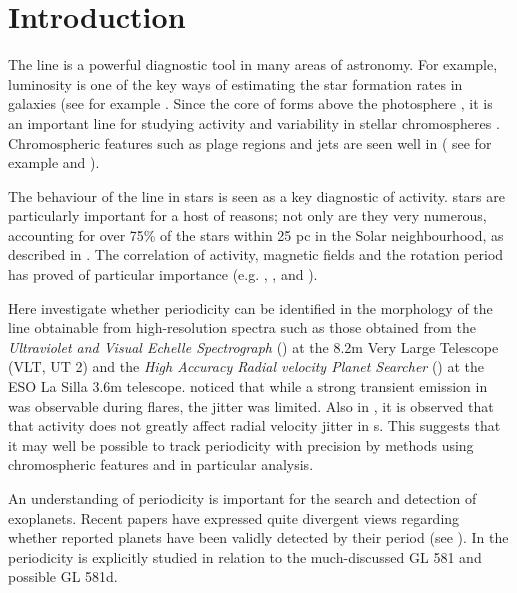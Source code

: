 \chapter{Introduction}
\protect\label{chapter:introduction}

The {\ha} line is a powerful diagnostic tool in many areas of astronomy. For example, {\ha} luminosity is one of the key
ways of estimating the star formation rates in galaxies (see for example \citet{rosagonzalez02}.  Since the core of
{\ha} forms above the photosphere \citep{vernazza81}, it is an important line for studying activity and variability in
stellar chromospheres \citep{hall08}. Chromospheric features such as plage regions and jets are seen well in {\ha} ( see
for example \citet{kneer10} and \citet{kuridze11}).

The behaviour of the {\ha} line in {\rdwarf} stars is seen as a key diagnostic of activity. {\rdwarf} stars are
particularly important for a host of reasons; not only are they very numerous, accounting for over 75\% of the stars
within 25 pc in the Solar neighbourhood, as described in \citet{winters15}. The correlation of activity, magnetic fields
and the rotation period has proved of particular importance (e.g. \citet{mohanty02}, \citet{mohanty03},
\citet{reiners08} and \citet{schmidt14}).

Here {\Firstp} investigate whether periodicity can be identified in the morphology of the {\ha} line obtainable from
high-resolution spectra such as those obtained from the \textit{Ultraviolet and Visual Echelle Spectrograph} ({\uves})
at the 8.2m Very Large Telescope (VLT, UT 2) and the \textit{High Accuracy Radial velocity Planet Searcher} ({\harps})
at the ESO La Silla 3.6m telescope.  \citet{barnes14} noticed that while a strong transient emission in {\ha} was
observable during flares, the jitter was limited. Also in \citet{reiners09}, it is observed that that activity does not
greatly affect radial velocity jitter in \rdwarf s. This suggests that it may well be possible to track periodicity with
precision by methods using chromospheric features and in particular {\ha} analysis.

An understanding of periodicity is important for the search and detection of exoplanets. Recent papers have expressed
quite divergent views regarding whether reported planets have been validly detected by their period (see
\citealt{barnes13,robertson14,robertson14a,tuomi13aug,robertson15}). In \citet{hatzes15} the {\ha} periodicity is 
explicitly studied in relation to the much-discussed GL 581 and possible GL 581d.

